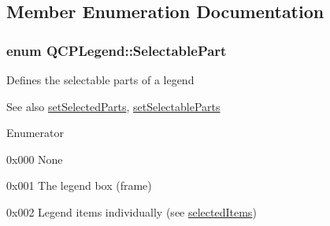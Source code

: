 \subsection{Member Enumeration Documentation}
\subsubsection[{\texorpdfstring{Selectable\+Part}{SelectablePart}}]{\setlength{\rightskip}{0pt plus 5cm}enum {\bf Q\+C\+P\+Legend\+::\+Selectable\+Part}}\hypertarget{classQCPLegend_a5404de8bc1e4a994ca4ae69e2c7072f1}{}\label{classQCPLegend_a5404de8bc1e4a994ca4ae69e2c7072f1}
Defines the selectable parts of a legend

\begin{DoxySeeAlso}{See also}
\hyperlink{classQCPLegend_a2aee309bb5c2a794b1987f3fc97f8ad8}{set\+Selected\+Parts}, \hyperlink{classQCPLegend_a9ce60aa8bbd89f62ae4fa83ac6c60110}{set\+Selectable\+Parts} 
\end{DoxySeeAlso}
\begin{Desc}
\item[Enumerator]\par
\begin{description}
\item[{\em 
sp\+None\hypertarget{classQCPLegend_a5404de8bc1e4a994ca4ae69e2c7072f1a378201c07d500af7126e3ec91652eed7}{}\label{classQCPLegend_a5404de8bc1e4a994ca4ae69e2c7072f1a378201c07d500af7126e3ec91652eed7}
}]{\ttfamily 0x000} None \item[{\em 
sp\+Legend\+Box\hypertarget{classQCPLegend_a5404de8bc1e4a994ca4ae69e2c7072f1a0fa4758962a46fa1dc9da818abae23c4}{}\label{classQCPLegend_a5404de8bc1e4a994ca4ae69e2c7072f1a0fa4758962a46fa1dc9da818abae23c4}
}]{\ttfamily 0x001} The legend box (frame) \item[{\em 
sp\+Items\hypertarget{classQCPLegend_a5404de8bc1e4a994ca4ae69e2c7072f1a768bfb95f323db4c66473375032c0af7}{}\label{classQCPLegend_a5404de8bc1e4a994ca4ae69e2c7072f1a768bfb95f323db4c66473375032c0af7}
}]{\ttfamily 0x002} Legend items individually (see \hyperlink{classQCPLegend_ac93eaf236e911d67aa8b88942ef45c5e}{selected\+Items}) \end{description}
\end{Desc}


